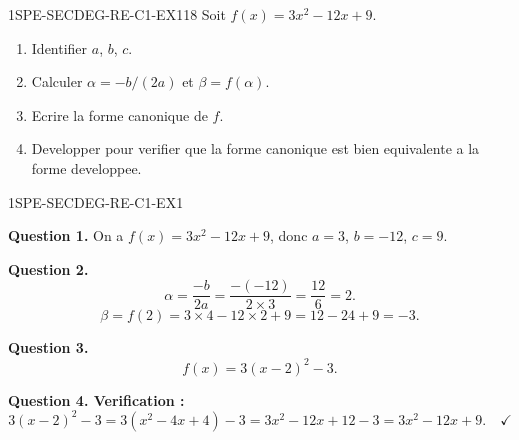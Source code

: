 


\begin{exercice}{1SPE-SECDEG-RE-C1-EX1}{1}{8}
Soit $f(x) = 3x^2 - 12x + 9$.
\begin{enumerate}
  \item Identifier $a$, $b$, $c$.
  \item Calculer $\alpha = -b/(2a)$ et $\beta = f(\alpha)$.
  \item Ecrire la forme canonique de $f$.
  \item Developper pour verifier que la forme canonique est bien equivalente a la forme developpee.
\end{enumerate}
\end{exercice}


\begin{corrige}{1SPE-SECDEG-RE-C1-EX1}


\textbf{Question 1.} On a $f(x) = 3x^2 - 12x + 9$, donc $a = 3$, $b = -12$, $c = 9$.


\textbf{Question 2.}
\[
\alpha = \frac{-b}{2a} = \frac{-(-12)}{2 \times 3} = \frac{12}{6} = 2.
\]
\[
\beta = f(2) = 3 \times 4 - 12 \times 2 + 9 = 12 - 24 + 9 = -3.
\]


\textbf{Question 3.}
\[
f(x) = 3(x - 2)^2 - 3.
\]

\textbf{Question 4. Verification :}
\[
3(x-2)^2 - 3 = 3(x^2 - 4x + 4) - 3 = 3x^2 - 12x + 12 - 3 = 3x^2 - 12x + 9. \quad \checkmark
\]

\end{corrige}

